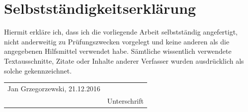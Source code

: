 \documentclass[
  a4paper,BCOR10mm,twoside,
  headsepline,footsepline,%
  fleqn,openbib
]{scrbook}
\begin{document}
\nocite{}



\chapter*{Selbstständigkeitserklärung}

Hiermit erkläre ich, dass ich die vorliegende Arbeit
selbstständig angefertigt, nicht anderweitig zu Prüfungszwecken vorgelegt und
keine anderen als die angegebenen Hilfsmittel verwendet habe. Sämtliche 
wissentlich verwendete Textausschnitte, Zitate oder Inhalte anderer Verfasser 
 wurden ausdrücklich als solche gekennzeichnet.%
\vspace{1cm}

\begin{tabular}{lp{4.8cm}}
Jan Grzegorzewski, 21.12.2016 & \dotfill                     \\
                          & Unterschrift 
\end{tabular}
\thispagestyle{empty}
\end{document}

